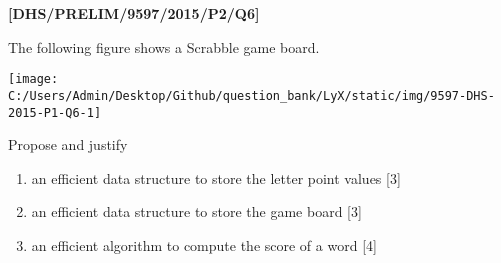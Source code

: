 \item \textbf{{[}DHS/PRELIM/9597/2015/P2/Q6{]} }

The following figure shows a Scrabble game board.
\begin{center}
\texttt{[image: C:/Users/Admin/Desktop/Github/question\_bank/LyX/static/img/9597-DHS-2015-P1-Q6-1]}
\par\end{center}

Propose and justify
\begin{enumerate}
\item an efficient data structure to store the letter point values \hfill{}{[}3{]}
\item an efficient data structure to store the game board \hfill{}{[}3{]}
\item an efficient algorithm to compute the score of a word \hfill{}{[}4{]}
\end{enumerate}